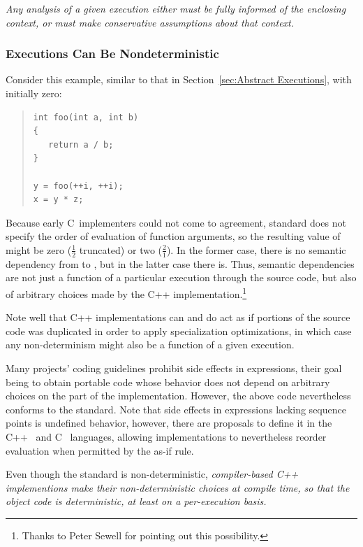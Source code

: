 \documentclass[10]{article}
\begin{document}
\emph{Any analysis of a given execution either must be fully informed
of the enclosing context, or must make conservative assumptions about
that context.}

\subsubsection{Executions Can Be Nondeterministic}
\label{sec:Executions Can Be Nondeterministic}

Consider this example, similar to that in
Section~\ref{sec:Abstract Executions},
with  initially zero:

\begin{quote}
\begin{verbatim}
int foo(int a, int b)
{
   return a / b;
}

y = foo(++i, ++i);
x = y * z;
\end{verbatim}
\end{quote}

Because early C~implementers could not come to agreement, standard
does not specify the order of evaluation of function arguments, so the
resulting value of  might be zero ($\frac{1}{2}$ truncated) or two
($\frac{2}{1}$).
In the former case, there is no semantic dependency from  to
, but in the latter case there is.
Thus, semantic dependencies are not just a function of a particular
execution through the source code, but also of arbitrary choices made
by the C++ implementation.\footnote{
	Thanks to Peter Sewell for pointing out this possibility.}

Note well that C++ implementations can and do act as if portions of
the source code was duplicated in order to apply specialization
optimizations, in which case any non-determinism might also be
a function of a given execution.

Many projects' coding guidelines prohibit side effects in expressions,
their goal being to obtain portable code whose behavior does not depend
on arbitrary choices on the part of the implementation.
However, the above code nevertheless conforms to the standard.
Note that side effects in expressions lacking sequence points is
undefined behavior, however, there are proposals to define it in the
C++~\cite{GabrielDosReis2016P0145r3} and
C~\cite{AlexCeleste2023N3203}
languages, allowing implementations to nevertheless reorder
evaluation when permitted by the as-if rule.

Even though the standard is non-deterministic, \emph{compiler-based C++
implementions make their non-deterministic choices at compile time, so
that the object code is deterministic, at least on a per-execution basis.}
\end{document}
